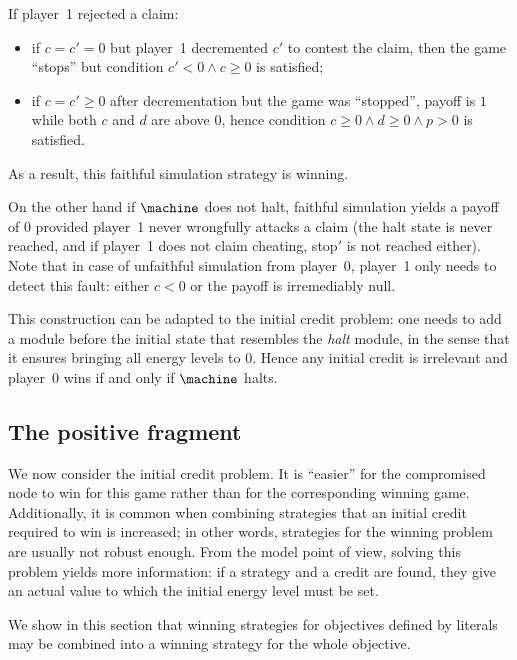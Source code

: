 If player~1 rejected a claim:
\begin{itemize}
\item if $c=c'=0$ but player~1 decremented $c'$ to contest the claim, then the game ``stops'' but condition $c'<0 \wedge c\geq0$ is satisfied;
\item if $c=c'\geq0$ after decrementation but the game was ``stopped'', payoff is $1$ while both $c$ and $d$ are above $0$, hence condition $c\geq0 \wedge d\geq0 \wedge p>0$ is satisfied.
\end{itemize}

As a result, this faithful simulation strategy is winning.

\bigskip

On the other hand if $\machine$ does not halt, faithful simulation yields a payoff of $0$ provided player~1 never wrongfully attacks a claim (the halt state is never reached, and if player~1 does not claim cheating, stop$'$ is not reached either).
Note that in case of unfaithful simulation from player~0, player~1 only needs to detect this fault: either $c<0$ or the payoff is irremediably null.

\bigskip

This construction can be adapted to the initial credit problem: one needs to add a module before the initial state that resembles the \emph{halt} module, in the sense that it ensures bringing all energy levels to $0$.
Hence any initial credit is irrelevant and player~0 wins if and only if $\machine$ halts.

\subsection{The positive fragment}

We now consider the initial credit problem.
It is ``easier'' for the compromised node to win for this game rather than for the corresponding winning game.
Additionally, it is common when combining strategies that an initial credit required to win is increased; in other words, strategies for the winning problem are usually not robust enough.
From the model point of view, solving this problem yields more information: if a strategy and a credit are found, they give an actual value to which the initial energy level must be set.

\bigskip

We show in this section that winning strategies for objectives defined by literals may be combined into a winning strategy for the whole objective.

